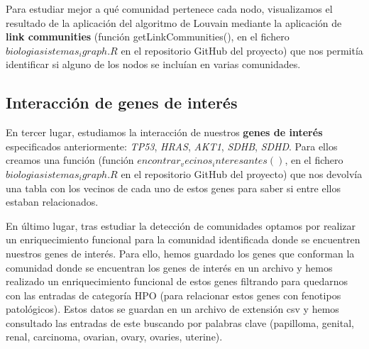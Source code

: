 Para estudiar mejor a qué comunidad pertenece cada nodo, visualizamos el resultado de la aplicación del algoritmo de Louvain mediante la aplicación de \textbf{link communities} (función getLinkCommunities(), en el fichero $biologiasistemas_igraph.R$ en el repositorio GitHub del proyecto) que nos permitía identificar si alguno de los nodos se incluían en varias comunidades. 

\vspace{3pt}
\subsection{Interacción de genes de interés}

En tercer lugar, estudiamos la interacción de nuestros \textbf{genes de interés} especificados anteriormente: \textit{TP53}, \textit{HRAS}, \textit{AKT1}, \textit{SDHB}, \textit{SDHD}. Para ellos creamos una función (función $encontrar_vecinos_interesantes()$, en el fichero $biologiasistemas_igraph.R$ en el repositorio GitHub del proyecto) que nos devolvía una tabla con los vecinos de cada uno de estos genes para saber si entre ellos estaban relacionados.

\vspace{3pt}

En último lugar, tras estudiar la detección de comunidades optamos por realizar un enriquecimiento funcional para la comunidad identificada donde se encuentren nuestros genes de interés. Para ello, hemos guardado los genes que conforman la comunidad donde se encuentran los genes de interés en un archivo y hemos realizado un enriquecimiento funcional de estos genes filtrando para quedarnos con las entradas de categoría HPO \cite{hpojax} (para relacionar estos genes con fenotipos patológicos).  Estos datos se guardan en un archivo de extensión csv y hemos consultado las entradas de este buscando por palabras clave (papilloma, genital, renal, carcinoma, ovarian, ovary, ovaries, uterine). 


